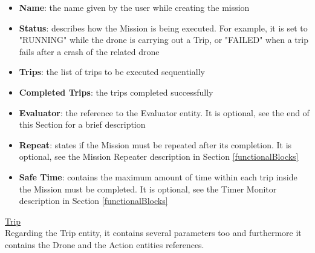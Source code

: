 \begin{itemize}
\item{\textbf{Name}: the name given by the user while creating the mission}
\item{\textbf{Status}: describes how the Mission is being executed. For example, it is set to "RUNNING" while the drone is carrying out a Trip, or "FAILED" when a trip fails after a crash of the related drone}
\item{\textbf{Trips}: the list of trips to be executed sequentially}
\item{\textbf{Completed Trips}: the trips completed successfully}
\item{\textbf{Evaluator}: the reference to the Evaluator entity. It is optional, see the end of this Section for a brief description}
\item{\textbf{Repeat}: states if the Mission must be repeated after its completion. It is optional, see the Mission Repeater description in Section \ref{functionalBlocks}}
\item{\textbf{Safe Time}: contains the maximum amount of time within each trip inside the Mission must be completed. It is optional, see the Timer Monitor description in Section \ref{functionalBlocks}}
\end{itemize}

\underline{Trip}
\\

Regarding the Trip entity, it contains several parameters too and furthermore it contains the Drone and the Action entities references.

